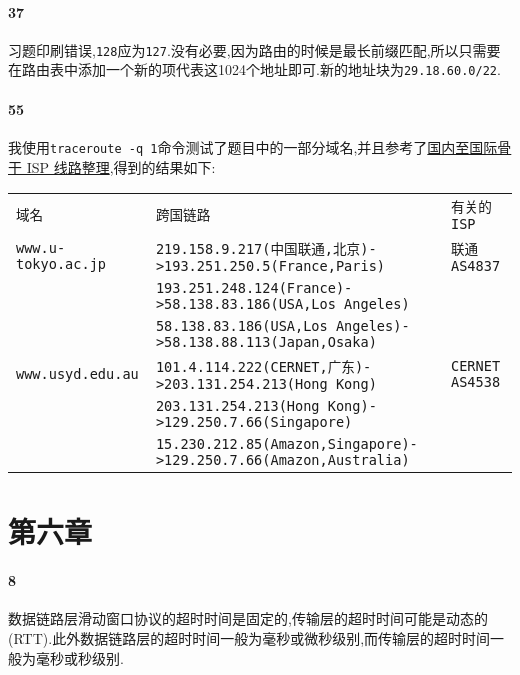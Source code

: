 \documentclass[a4paper]{article}
\begin{document}
\paragraph{37}
习题印刷错误,\verb|128|应为\verb|127|.没有必要,因为路由的时候是最长前缀匹配,所以只需要在路由表中添加一个新的项代表这1024个地址即可.新的地址块为\verb|29.18.60.0/22|.
\paragraph{55}
我使用\verb|traceroute -q 1|命令测试了题目中的一部分域名,并且参考了\href{https://www.gd1214b.icu/post/qfDddx_kZ/}{国内至国际骨干 ISP 线路整理},得到的结果如下:
\begin{table}[H]
    \begin{tabular}{|lll|}
        \hline
        \verb|域名|                & \verb|跨国链路|                                                            & \verb|有关的ISP|        \\
        \verb|www.u-tokyo.ac.jp| & \verb|219.158.9.217(中国联通,北京)->193.251.250.5(France,Paris)|             & \verb|联通AS4837|      \\
                                 & \verb|193.251.248.124(France)->58.138.83.186(USA,Los Angeles)|         &                      \\
                                 & \verb|58.138.83.186(USA,Los Angeles)->58.138.88.113(Japan,Osaka)|      &                      \\
        \verb|www.usyd.edu.au|   & \verb|101.4.114.222(CERNET,广东)->203.131.254.213(Hong Kong)|            & \verb|CERNET AS4538| \\
                                 & \verb|203.131.254.213(Hong Kong)->129.250.7.66(Singapore)|             &                      \\
                                 & \verb|15.230.212.85(Amazon,Singapore)->129.250.7.66(Amazon,Australia)| &                      \\
        \hline
    \end{tabular}
\end{table}
\section{第六章}
\paragraph{8}
数据链路层滑动窗口协议的超时时间是固定的,传输层的超时时间可能是动态的(RTT).此外数据链路层的超时时间一般为毫秒或微秒级别,而传输层的超时时间一般为毫秒或秒级别.
\end{document}
